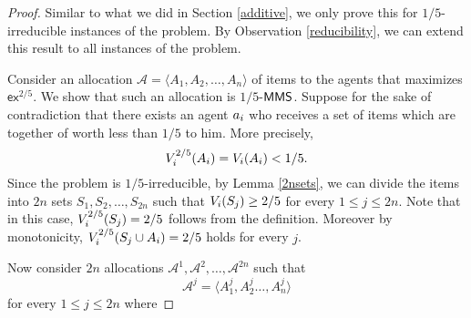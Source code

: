 \begin{proof}
Similar to what we did in Section \ref{additive}, we only prove this for $1/5$-irreducible instances of the problem. By Observation \ref{reducibility}, we can extend this result to all instances of the problem.

Consider an allocation $\mathcal{A} = \langle A_1, A_2, \ldots, A_n\rangle$ of items to the agents that maximizes $\mathsf{ex}^{2/5}$.
We show that such an allocation is $1/5$-$\mathsf{MMS}$. Suppose for the sake of contradiction that there exists an agent $a_i$ who receives a set of items which are together of worth less than $1/5$ to him. More precisely,
$$V^{2/5}_i(A_i) = V_i(A_i) < 1/5.$$ 
Since the problem is $1/5$-irreducible, by Lemma \ref{2nsets}, we can divide the items into $2n$ sets $S_1, S_2, \ldots, S_{2n}$ such that $V_i(S_j) \geq 2/5$ for every $1 \leq j \leq 2n$. Note that in this case, $V^{2/5}_i(S_j) = 2/5$ follows from the definition. Moreover by monotonicity, $V^{2/5}_i(S_j \cup A_i) = 2/5$ holds for every $j$.

Now consider $2n$ allocations $\mathcal{A}^1, \mathcal{A}^2, \ldots, \mathcal{A}^{2n}$ such that 
$$\mathcal{A}^{j} = \langle A^j_1, A^j_2 \ldots, A^j_n\rangle$$ for every $1 \leq j \leq 2n$ where 


\end{proof}
